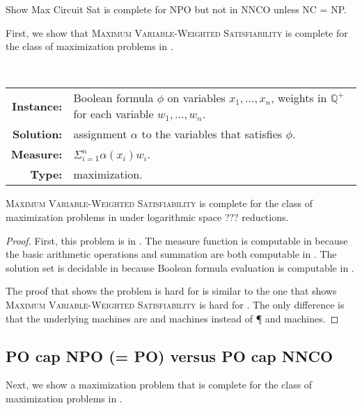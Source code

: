 \documentclass[]{article}
\begin{document}
\begin{todo}
  Show Max Circuit Sat is complete for NPO but not in NNCO unless NC = NP.
\end{todo}

First, we show that \textsc{Maximum Variable-Weighted Satisfiability} is complete for the class of maximization problems in \NNCO.

\begin{definition}
  \mbox{} \\
  \begin{tabular}{r p{9.5cm}}
    \textbf{Instance:} & Boolean formula $\phi$ on variables $x_1, \dotsc, x_n$, weights in $\mathbb{Q}^+$ for each variable $w_1, \dotsc, w_n$. \\
    \textbf{Solution:} & assignment $\alpha$ to the variables that satisfies $\phi$. \\
    \textbf{Measure:} & $\Sigma_{i = 1}^n \alpha(x_i) w_i$. \\
    \textbf{Type:} & maximization.
  \end{tabular}
\end{definition}

\begin{theorem}
  \textsc{Maximum Variable-Weighted Satisfiability} is complete for the class of maximization problems in \NNCO{} under logarithmic space ??? reductions.
\end{theorem}
\begin{proof}
  First, this problem is in \NNCO.
  The measure function is computable in \FNC{} because the basic arithmetic operations and summation are both computable in \FNC{}.
  The solution set is decidable in \NC{} because Boolean formula evaluation is computable in \NC{} \cite{buss87}.

  The proof that shows the problem is hard for \NNCO{} is similar to the one that shows \textsc{Maximum Variable-Weighted Satisfiability} is hard for \NPO{} \cite[Theorem~3.1]{om87} \cite[Theorem~8.3]{acgkmp99}.
  The only difference is that the underlying machines are \NC{} and \NNC{} machines instead of \P{} and \NP{} machines.
\end{proof}

\subsection{PO cap NPO (= PO) versus PO cap NNCO}

Next, we show a maximization problem that is complete for the class of maximization problems in \PO.
\end{document}
